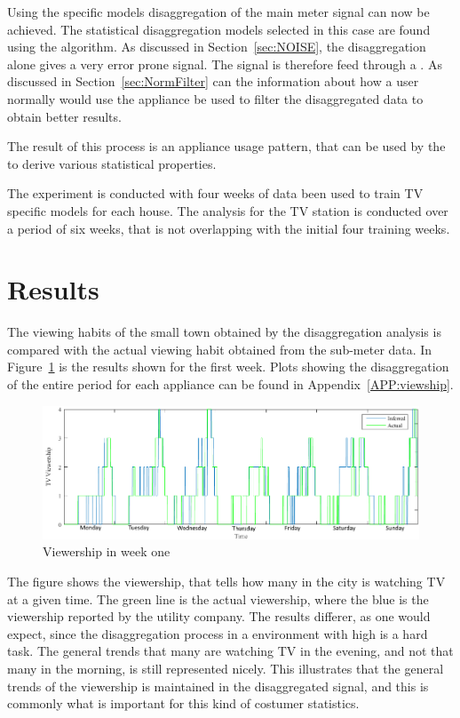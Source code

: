 Using the specific models disaggregation of the main meter signal can now be achieved. The statistical disaggregation models selected in this case are found using the  algorithm. As discussed in Section~\ref{sec:NOISE}, the disaggregation alone gives a very error prone signal. The signal is therefore feed through a . As discussed in Section~\ref{sec:NormFilter} can the information about how a user normally would use the appliance be used to filter the disaggregated data to obtain better results. 

The result of this process is an appliance usage pattern, that can be used by the  to derive various statistical properties.  

The experiment is conducted with four weeks of data been used to train TV specific models for each house. The analysis for the TV station is conducted over a period of six weeks, that is not overlapping with the initial four training weeks. 

\section{Results}
The viewing habits of the small town obtained by the disaggregation analysis is compared with the actual viewing habit obtained from the sub-meter data. In Figure~\ref{fig:WHW} is the results shown for the first week. Plots showing the disaggregation of the entire period for each appliance can be found in Appendix~\ref{APP:viewship}.

\begin{figure}[H]
\centering
\includegraphics[width=1\textwidth]{billeder/Viewership.png}
\caption{Viewership in week one}
\label{fig:WHW}
\end{figure}

The figure shows the viewership, that tells how many in the city is watching TV at a given time. The green line is the actual viewership, where the blue is the viewership reported by the utility company. The results differer, as one would expect, since the disaggregation process in a environment with high  is a hard task. The general trends that many are watching TV in the evening, and not that many in the morning, is still represented nicely. This illustrates that the general trends of the viewership is maintained in the disaggregated signal, and this is commonly what is important for this kind of costumer statistics. 

